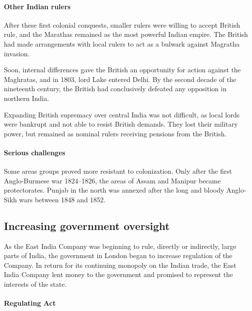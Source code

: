 \documentclass[11pt, a4paper, headings=standardclasses]{scrartcl}
\begin{document}
\paragraph{Other Indian rulers}

After these first colonial conquests, smaller rulers were willing to accept British rule\autocite[Chapter 4, sections 8 and 9]{RF}, and the Marathas remained as the most powerful Indian empire. The British had made arrangements with local rulers to act as a bulwark against Magratha invasion.\autocite[273]{RF}

Soon, internal differences gave the British an opportunity for action against the Magh\-ratas, and in 1803, lord Lake entered Delhi. By the second decade of the nineteenth century, the British had conclusively defeated any opposition in northern India.\autocite[274]{RF}

Expanding British supremacy over central India was not difficult, as local lords were bankrupt and not able to resist British demands. They lost their military power, but remained as nominal rulers receiving pensions from the British.\autocite[276]{RF}

\paragraph{Serious challenges}

Some areas groups proved more resistant to colonization. Only after the first Anglo-Burmese war 1824--1826, the areas of Assam and Manipur became protectorates. Punjab in the north was annexed after the long and bloody Anglo-Sikh wars between 1848 and 1852.\autocite[277]{RF}

\subsection{Increasing government oversight}

As the East India Company was beginning to rule, directly or indirectly, large parts of India, the government in London began to increase regulation of the Company. In return for its continuing monopoly on the Indian trade, the East India Company lent money to the government and promised to represent the interests of the state.\autocite[394]{RF, parliament}

\paragraph{Regulating Act}
\end{document}
